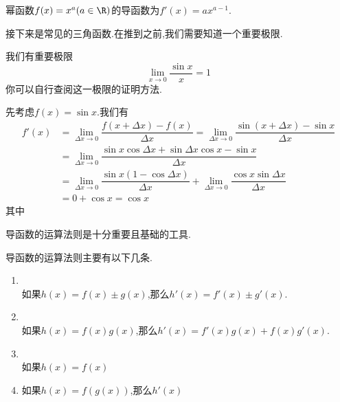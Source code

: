 \documentclass{ctexart}
\begin{document}
\begin{theorem}[0A.1.2 幂函数的导数]
    幂函数$f(x)=x^a(a\in\R)$的导函数为$f'(x)=ax^{a-1}$.
\end{theorem}
接下来是常见的三角函数.在推到之前,我们需要知道一个重要极限.
\begin{theorem}[0A.1.3 重要极限I]
    我们有重要极限
    \[\lim_{x\to0}\dfrac{\sin x}{x}=1\]
    你可以自行查阅这一极限的证明方法.
\end{theorem}
\begin{derivation}
    先考虑$f(x)=\sin x$.我们有
    \[\begin{aligned}
        f'(x)
        &= \lim_{\Delta x\to0}\dfrac{f(x+\Delta x)-f(x)}{\Delta x}=\lim_{\Delta x\to0}\dfrac{\sin(x+\Delta x)-\sin{x}}{\Delta x} \\
        &= \lim_{\Delta x\to0}\dfrac{\sin x\cos\Delta x+\sin\Delta x\cos x-\sin x}{\Delta x} \\
        &= \lim_{\Delta x\to0}\dfrac{\sin x(1-\cos\Delta x)}{\Delta x}+\lim_{\Delta x\to0}\dfrac{\cos x\sin\Delta x}{\Delta x} \\
        &= 0+\cos x=\cos x
    \end{aligned}\]
    其中
\end{derivation}
\indent 导函数的运算法则是十分重要且基础的工具.
\begin{theorem}[0A.1.2]
    导函数的运算法则主要有以下几条.
    \begin{enumerate}[label=\tbf{\roman*.},topsep=0pt,parsep=0pt,itemsep=0pt,partopsep=0pt]
        \item {}\\如果$h(x)=f(x)\pm g(x)$,那么$h'(x)=f'(x)\pm g'(x)$.
        \item {}\\如果$h(x)=f(x)g(x)$,那么$h'(x)=f'(x)g(x)+f(x)g'(x)$.
        \item {}\\如果$h(x)=f(x)$
        \item 如果$h(x)=f(g(x))$,那么$h'(x)$
    \end{enumerate}
\end{theorem}
\end{document}
